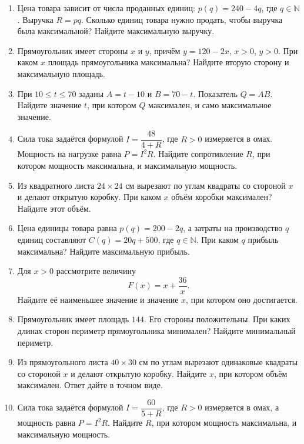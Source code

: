 \documentclass[a4paper,12pt]{article}
\begin{document}
\begin{enumerate}
  \item Цена товара зависит от числа проданных единиц: $p(q)=240-4q$, где $q\in\mathbb N$. Выручка $R=pq$. Сколько единиц товара нужно продать, чтобы выручка была максимальной? Найдите максимальную выручку.

  \item Прямоугольник имеет стороны $x$ и $y$, причём $y=120-2x$, $x>0$, $y>0$. При каком $x$ площадь прямоугольника максимальна? Найдите вторую сторону и максимальную площадь.

  \item При $10\le t\le70$ заданы $A=t-10$ и $B=70-t$. Показатель $Q=AB$. Найдите значение $t$, при котором $Q$ максимален, и само максимальное значение.

  \item Сила тока задаётся формулой $I=\dfrac{48}{4+R}$, где $R>0$ измеряется в омах. Мощность на нагрузке равна $P=I^2R$. Найдите сопротивление $R$, при котором мощность максимальна, и максимальную мощность.

  \item Из квадратного листа $24\times24$ см вырезают по углам квадраты со стороной $x$ и делают открытую коробку. При каком $x$ объём коробки максимален? Найдите этот объём.

  \item Цена единицы товара равна $p(q)=200-2q$, а затраты на производство $q$ единиц составляют $C(q)=20q+500$, где $q\in\mathbb N$. При каком $q$ прибыль максимальна? Найдите максимальную прибыль.

  \item Для $x>0$ рассмотрите величину
  \[
    F(x)=x+\frac{36}{x}.
  \]
  Найдите её наименьшее значение и значение $x$, при котором оно достигается.

  \item Прямоугольник имеет площадь $144$. Его стороны положительны. При каких длинах сторон периметр прямоугольника минимален? Найдите минимальный периметр.

  \item Из прямоугольного листа $40\times30$ см по углам вырезают одинаковые квадраты со стороной $x$ и делают открытую коробку. Найдите $x$, при котором объём максимален. Ответ дайте в точном виде.

  \item Сила тока задаётся формулой $I=\dfrac{60}{5+R}$, где $R>0$ измеряется в омах, а мощность равна $P=I^2R$. Найдите $R$, при котором мощность максимальна, и максимальную мощность.
\end{enumerate}
\end{document}
